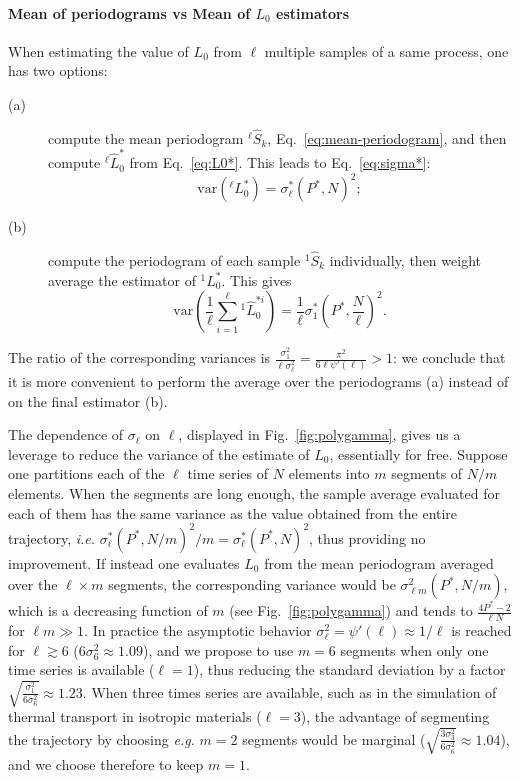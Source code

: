 \begin{LEtext}
\paragraph{Mean of periodograms vs Mean of $L_0$ estimators}
When estimating the value of $L_{0}$ from $\ell$ multiple samples of a same process, one has two options:
\begin{description}
    \item[(a)] compute the mean periodogram ${^{\ell\!}}\hat{S}_k$, Eq.~\eqref{eq:mean-periodogram}, and then compute ${^{\ell\!}}\hat{L}_0^*$ from Eq.~\eqref{eq:L0*}. This leads to Eq.~\eqref{eq:sigma*}:
    \begin{equation}
        \textstyle
        \mathrm{var}\left( {^{\ell\!}}L_0^* \right) = \sigma^*_\ell \left(P^*,N\right)^2 ;
    \end{equation}
    \item[(b)] compute the periodogram of each sample ${^{1\!}}\hat{S}_k$ individually, then weight average the estimator of ${^{1\!}}L_0^*$. This gives
    \begin{equation}
        \textstyle
        \mathrm{var}\left( \frac{1}{\ell} \sum_{i=1}^\ell {^{1\!}}\hat{L}_0^{*i} \right) = \frac{1}{\ell} \sigma_1^* \left(P^*,\frac{N}{\ell}\right)^2 .
    \end{equation}
\end{description}
The ratio of the corresponding variances is $\frac{\sigma_{1}^{2}}{\ell\sigma_{\ell}^{2}} = \frac{\pi^2}{6\ell\psi'(\ell)} > 1$: we conclude that it is more convenient to perform the average over the periodograms (a) instead of on the final estimator (b).

The dependence of $\sigma_{\ell}$ on $\ell$, displayed in Fig.~\ref{fig:polygamma}, gives us a leverage to reduce the variance of the estimate of $L_{0}$, essentially for free. Suppose one partitions each of the $\ell$ time series of $N$ elements into $m$ segments of $N/m$ elements. When the segments are long enough, the sample average evaluated for each of them has the same variance as the value obtained from the entire trajectory, \emph{i.e.} $\sigma_\ell^{*}(P^{*},N/m)^{2}/m = \sigma_\ell^{*}(P^{*},N)^{2}$, thus providing no improvement. If instead one evaluates ${L}_{0}$ from the mean periodogram averaged over the $\ell \times m$ segments, the corresponding variance would be $\sigma_{\ell m}^2(P^*,N/m)$, which is a decreasing function of $m$ (see Fig.~\ref{fig:polygamma}) and tends to $\frac{4P^{*}-2}{\ell N}$ for $\ell m\gg 1$. In practice the asymptotic behavior $\sigma_{\ell}^{2} = \psi'(\ell) \approx 1/\ell$ is reached for $\ell \gtrsim 6$ ($6\sigma_{6}^{2}\approx 1.09$), and we propose to use $m=6$ segments when only one time series is available ($\ell=1$), thus reducing the standard deviation by a factor $\sqrt{\frac{\sigma_{1}^{2}}{6\sigma_{6}^{2}}}\approx 1.23$. When three times series are available, such as in the simulation of thermal transport in isotropic materials ($\ell=3$), the advantage of segmenting the trajectory by choosing \emph{e.g.} $m=2$ segments would be marginal ($\sqrt{\frac{3\sigma_{3}^{2}}{6\sigma_{6}^{2}}} \approx 1.04$), and we choose therefore to keep $m=1$. 
\end{LEtext}


